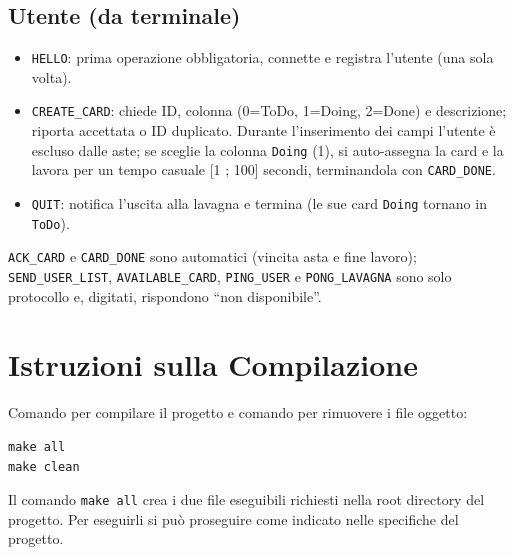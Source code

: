 \documentclass[10pt,a4paper, titlepage]{article}
\begin{document}
\subsection*{Utente (da terminale)}
\begin{itemize}\setlength{\itemsep}{1pt}\setlength{\parsep}{0pt}
    \item \texttt{HELLO}: prima operazione obbligatoria, connette e registra l'utente (una sola volta).
    \item \texttt{CREATE\_CARD}: chiede ID, colonna (0=ToDo, 1=Doing, 2=Done) e descrizione; riporta accettata o ID duplicato. Durante l'inserimento dei campi l'utente è escluso dalle aste; se sceglie la colonna \texttt{Doing} (1), si auto-assegna la card e la lavora per un tempo casuale [1 ; 100] secondi, terminandola con \texttt{CARD\_DONE}.
    \item \texttt{QUIT}: notifica l'uscita alla lavagna e termina (le sue card \texttt{Doing} tornano in \texttt{ToDo}).
\end{itemize}
\texttt{ACK\_CARD} e \texttt{CARD\_DONE} sono automatici (vincita asta e fine lavoro); \texttt{SEND\_USER\_LIST}, \texttt{AVAILABLE\_CARD}, \texttt{PING\_USER} e \texttt{PONG\_LAVAGNA} sono solo protocollo e, digitati, rispondono ``non disponibile''.

\section*{Istruzioni sulla Compilazione}
Comando per compilare il progetto e comando per rimuovere i file oggetto:
\begin{verbatim}
make all
make clean
\end{verbatim}
Il comando \texttt{make all} crea i due file eseguibili richiesti nella root directory del progetto.
Per eseguirli si può proseguire come indicato nelle specifiche del progetto.
\end{document}
